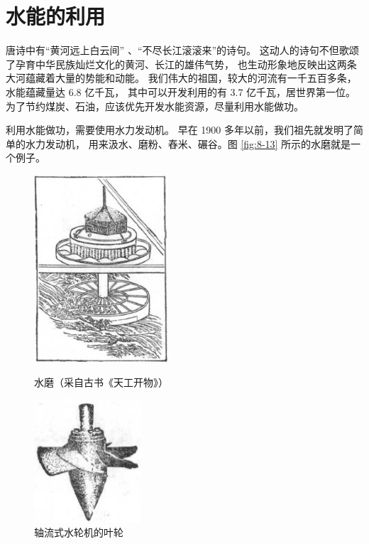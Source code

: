 \section{水能的利用}\label{sec:8-8}

唐诗中有“黄河远上白云间” 、“不尽长江滚滚来”的诗句。
这动人的诗句不但歌颂了孕育中华民族灿烂文化的黄河、长江的雄伟气势，
也生动形象地反映出这两条大河蕴藏着大量的势能和动能。
我们伟大的祖国，较大的河流有一千五百多条，水能蕴藏量达 6.8 亿千瓦，
其中可以开发利用的有 3.7 亿千瓦，居世界第一位。
为了节约煤炭、石油，应该优先开发水能资源，尽量利用水能做功。

利用水能做功，需要使用水力发动机。
早在 1900 多年以前，我们祖先就发明了简单的水力发动机，
用来汲水、磨粉、舂米、碾谷。图 \ref{fig:8-13} 所示的水磨就是一个例子。

\begin{figure}[htbp]
    \centering
    \begin{minipage}{7cm}
    \centering
    \includegraphics[width=5cm]{../pic/czwl1-ch8-13}
    \caption{水磨（采自古书《天工开物》）}\label{fig:8-13}
    \end{minipage}
    \qquad
    \begin{minipage}{7cm}
    \centering
    \vspace{6em}
    \includegraphics[width=4cm]{../pic/czwl1-ch8-14}
    \caption{轴流式水轮机的叶轮}\label{fig:8-14}
    \end{minipage}
\end{figure}


